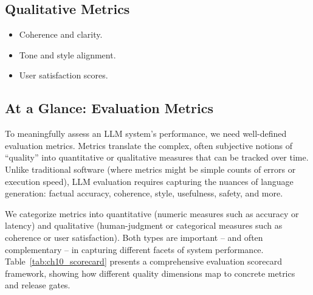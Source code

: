 \subsection{Qualitative Metrics}
\begin{itemize}
    \item Coherence and clarity.
    \item Tone and style alignment.
    \item User satisfaction scores.
\end{itemize}

\subsection*{At a Glance: Evaluation Metrics}
To meaningfully assess an LLM system’s performance, we need well-defined evaluation metrics. Metrics translate the complex, often subjective notions of “quality” into quantitative or qualitative measures that can be tracked over time. Unlike traditional software (where metrics might be simple counts of errors or execution speed), LLM evaluation requires capturing the nuances of language generation: factual accuracy, coherence, style, usefulness, safety, and more.  

We categorize metrics into quantitative (numeric measures such as accuracy or latency) and qualitative (human-judgment or categorical measures such as coherence or user satisfaction). Both types are important – and often complementary – in capturing different facets of system performance. Table~\ref{tab:ch10_scorecard} presents a comprehensive evaluation scorecard framework, showing how different quality dimensions map to concrete metrics and release gates.


